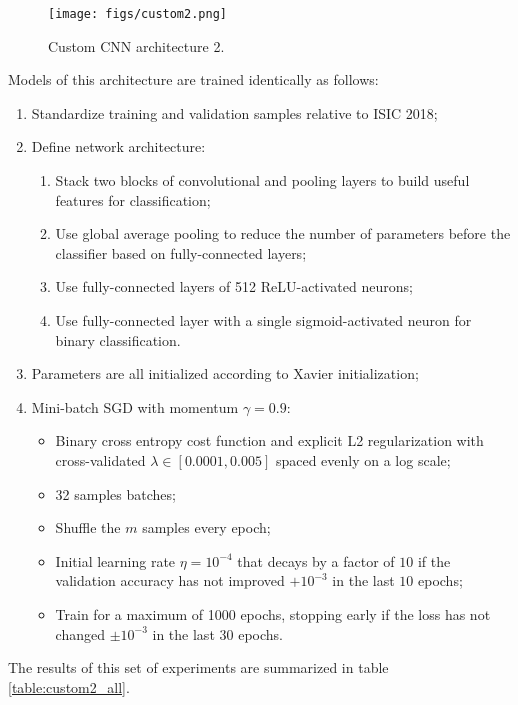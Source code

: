 \begin{figure}[ht]
    \centering
    \texttt{[image: figs/custom2.png]}
    \caption{Custom \ac{CNN} architecture 2.}
    \label{fig:custom2}
\end{figure}

Models of this architecture are trained identically as follows:

\begin{enumerate}
    \item Standardize training and validation samples relative to \ac{ISIC} 2018;
    \item Define network architecture:
        \begin{enumerate}
            \item Stack two blocks of convolutional and pooling layers to build useful features for classification;
            \item Use global average pooling to reduce the number of parameters before the classifier based on fully-connected layers;
            \item Use fully-connected layers of 512 ReLU-activated neurons;
            \item Use fully-connected layer with a single sigmoid-activated neuron for binary classification.
        \end{enumerate}
    \item Parameters are all initialized according to Xavier initialization;
    \item Mini-batch \ac{SGD} with momentum $\gamma = 0.9$:
        \begin{itemize}
            \item Binary cross entropy cost function and explicit L2 regularization with cross-validated $\lambda \in [0.0001, 0.005]$ spaced evenly on a log scale;
            \item 32 samples batches;
            \item Shuffle the $m$ samples every epoch;
            \item Initial learning rate $\eta = 10^{-4}$ that decays by a factor of $10$ if the validation accuracy has not improved $+10^{-3}$ in the last $10$ epochs;
            \item Train for a maximum of 1000 epochs, stopping early if the loss has not changed $\pm 10^{-3}$ in the last $30$ epochs.
        \end{itemize}
\end{enumerate}

The results of this set of experiments are summarized in table \ref{table:custom2_all}.

